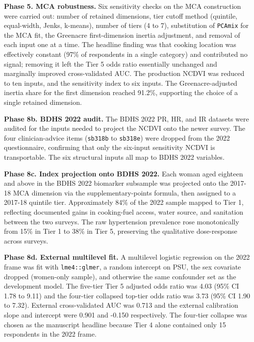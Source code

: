 \documentclass[
  12pt,
  a4paper]{article}
\begin{document}
\textbf{Phase 5. MCA robustness.} Six sensitivity checks on the MCA construction were carried out: number of retained dimensions, tier cutoff method (quintile, equal-width, Jenks, k-means), number of tiers (4 to 7), substitution of \texttt{PCAmix} for the MCA fit, the Greenacre first-dimension inertia adjustment, and removal of each input one at a time. The headline finding was that cooking location was effectively constant (97\% of respondents in a single category) and contributed no signal; removing it left the Tier 5 odds ratio essentially unchanged and marginally improved cross-validated AUC. The production NCDVI was reduced to ten inputs, and the sensitivity index to six inputs. The Greenacre-adjusted inertia share for the first dimension reached 91.2\%, supporting the choice of a single retained dimension.

\textbf{Phase 8b. BDHS 2022 audit.} The BDHS 2022 PR, HR, and IR datasets were audited for the inputs needed to project the NCDVI onto the newer survey. The four clinician-advice items (\texttt{sb318b} to \texttt{sb318e}) were dropped from the 2022 questionnaire, confirming that only the six-input sensitivity NCDVI is transportable. The six structural inputs all map to BDHS 2022 variables.

\textbf{Phase 8c. Index projection onto BDHS 2022.} Each woman aged eighteen and above in the BDHS 2022 biomarker subsample was projected onto the 2017-18 MCA dimension via the supplementary-points formula, then assigned to a 2017-18 quintile tier. Approximately 84\% of the 2022 sample mapped to Tier 1, reflecting documented gains in cooking-fuel access, water source, and sanitation between the two surveys. The raw hypertension prevalence rose monotonically from 15\% in Tier 1 to 38\% in Tier 5, preserving the qualitative dose-response across surveys.

\textbf{Phase 8d. External multilevel fit.} A multilevel logistic regression on the 2022 frame was fit with \texttt{lme4::glmer}, a random intercept on PSU, the sex covariate dropped (women-only sample), and otherwise the same confounder set as the development model. The five-tier Tier 5 adjusted odds ratio was 4.03 (95\% CI 1.78 to 9.11) and the four-tier collapsed top-tier odds ratio was 3.73 (95\% CI 1.90 to 7.32). External cross-validated AUC was 0.713 and the external calibration slope and intercept were 0.901 and -0.150 respectively. The four-tier collapse was chosen as the manuscript headline because Tier 4 alone contained only 15 respondents in the 2022 frame.
\end{document}
